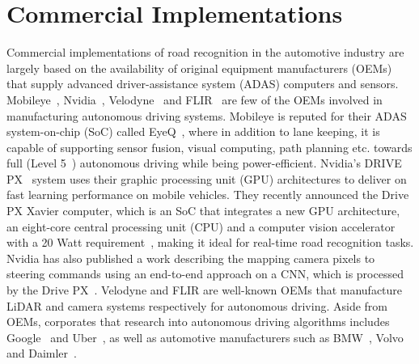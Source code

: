 \section{Commercial Implementations} \label{seccommercial}
Commercial implementations of road recognition in the automotive industry are largely based on the availability of original equipment manufacturers (OEMs) that supply advanced driver-assistance system (ADAS) computers and sensors. Mobileye~\cite{mobileye_mobileye_2016}, Nvidia~\cite{nvidia_corporation_nvidia_2017-1}, Velodyne~\cite{velodyne_lidar_velodyne_2017-1} and FLIR~\cite{flir_systems_flir_2017-1} are few of the OEMs involved in manufacturing autonomous driving systems. Mobileye is reputed for their ADAS system-on-chip (SoC) called EyeQ~\cite{mobileye_evolution_2017}, where in addition to lane keeping, it is capable of supporting sensor fusion, visual computing, path planning etc. towards full (Level 5~\cite{sae_international_u.s._2016-1}) autonomous driving while being power-efficient. Nvidia's DRIVE PX~\cite{nvidia_corporation_nvidia_2017-1} system uses their graphic processing unit (GPU) architectures to deliver on fast learning performance on mobile vehicles. They recently announced the Drive PX Xavier computer, which is an SoC that integrates a new GPU architecture, an eight-core central processing unit (CPU) and a computer vision accelerator with a 20 Watt requirement~\cite{shapiro_introducing_2016}, making it ideal for real-time road recognition tasks. Nvidia has also published a work describing the mapping camera pixels to steering commands using an end-to-end approach on a CNN, which is processed by the Drive PX~\cite{bojarski_end_2016}. Velodyne and FLIR are well-known OEMs that manufacture LiDAR and camera systems respectively for autonomous driving. Aside from OEMs, corporates that research into autonomous driving algorithms includes Google~\cite{waymo_waymo_2017} and Uber~\cite{etherington_ubers_2016}, as well as automotive manufacturers such as BMW~\cite{nica_bmw_2016}, Volvo~\cite{volvo_car_corporation_autonomous_2017-1} and Daimler~\cite{daimler_ag._autonomous_2017}.


